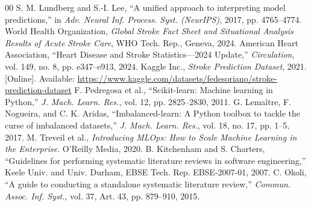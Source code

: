 \documentclass[10pt,journal,compsoc]{IEEEtran}
\begin{document}
\begin{thebibliography}{00}
 S. M. Lundberg and S.-I. Lee, ``A unified approach to interpreting model predictions,'' in \textit{Adv. Neural Inf. Process. Syst. (NeurIPS)}, 2017, pp. 4765--4774.
 World Health Organization, \textit{Global Stroke Fact Sheet and Situational Analysis Results of Acute Stroke Care}, WHO Tech. Rep., Geneva, 2024.
 American Heart Association, ``Heart Disease and Stroke Statistics---2024 Update,'' \textit{Circulation}, vol. 149, no. 8, pp. e347--e913, 2024.
 Kaggle Inc., \textit{Stroke Prediction Dataset}, 2021. [Online]. Available: \url{https://www.kaggle.com/datasets/fedesoriano/stroke-prediction-dataset}
 F. Pedregosa et al., ``Scikit-learn: Machine learning in Python,'' \textit{J. Mach. Learn. Res.}, vol. 12, pp. 2825--2830, 2011.
 G. Lema\^{i}tre, F. Nogueira, and C. K. Aridas, ``Imbalanced-learn: A Python toolbox to tackle the curse of imbalanced datasets,'' \textit{J. Mach. Learn. Res.}, vol. 18, no. 17, pp. 1--5, 2017.
 M. Treveil et al., \textit{Introducing MLOps: How to Scale Machine Learning in the Enterprise}. O'Reilly Media, 2020.
 B. Kitchenham and S. Charters, ``Guidelines for performing systematic literature reviews in software engineering,'' Keele Univ. and Univ. Durham, EBSE Tech. Rep. EBSE-2007-01, 2007.
 C. Okoli, ``A guide to conducting a standalone systematic literature review,'' \textit{Commun. Assoc. Inf. Syst.}, vol. 37, Art. 43, pp. 879--910, 2015.
\end{thebibliography}
\end{document}
